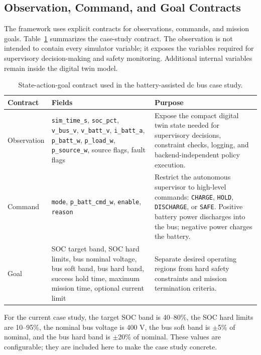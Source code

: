 \documentclass[conference]{IEEEtran}
\begin{document}
\subsection{Observation, Command, and Goal Contracts}

The framework uses explicit contracts for observations, commands, and mission
goals. Table~\ref{tab:contracts} summarizes the case-study contract. The
observation is not intended to contain every simulator variable; it exposes
the variables required for supervisory decision-making and safety monitoring.
Additional internal variables remain inside the digital twin model.

\begin{table}[t]
\caption{State-action-goal contract used in the battery-assisted dc bus case study.}
\label{tab:contracts}
\centering
\small
\begin{tabular}{|p{}|p{}|p{}|}
\hline
\textbf{Contract} & \textbf{Fields} & \textbf{Purpose} \\
\hline
Observation &
\texttt{sim\_time\_s}, \texttt{soc\_pct}, \texttt{v\_bus\_v},
\texttt{v\_batt\_v}, \texttt{i\_batt\_a}, \texttt{p\_batt\_w},
\texttt{p\_load\_w}, \texttt{p\_source\_w}, source flags, fault flags &
Expose the compact digital twin state needed for supervisory decisions,
constraint checks, logging, and backend-independent policy execution. \\
\hline
Command &
\texttt{mode}, \texttt{p\_batt\_cmd\_w}, \texttt{enable}, \texttt{reason} &
Restrict the autonomous supervisor to high-level commands:
\texttt{CHARGE}, \texttt{HOLD}, \texttt{DISCHARGE}, or \texttt{SAFE}.
Positive battery power discharges into the bus; negative power charges the
battery. \\
\hline
Goal &
SOC target band, SOC hard limits, bus nominal voltage, bus soft band, bus hard
band, success hold time, maximum mission time, optional current limit &
Separate desired operating regions from hard safety constraints and mission
termination criteria. \\
\hline
\end{tabular}
\end{table}

For the current case study, the target SOC band is 40--80\%, the SOC hard
limits are 10--95\%, the nominal bus voltage is 400 V, the bus soft band is
$\pm$5\% of nominal, and the bus hard band is $\pm$20\% of nominal. These
values are configurable; they are included here to make the case study
concrete.
\end{document}
